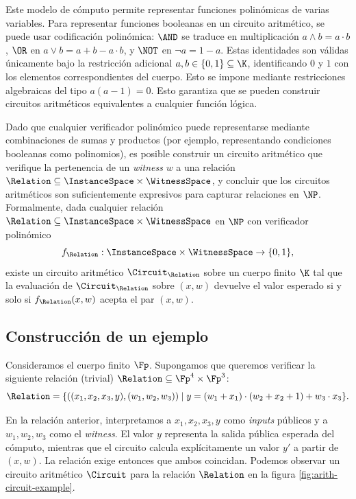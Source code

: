 Este modelo de cómputo permite representar funciones polinómicas de varias variables. Para representar funciones booleanas en un circuito aritmético, se puede usar codificación polinómica: $\AND$ se traduce en multiplicación  $a \wedge b = a \cdot b$, $\OR$ en $a \vee b = a + b - a \cdot b$, y $\NOT$ en $\neg a = 1 - a$. Estas identidades son válidas únicamente bajo la restricción adicional $a, b \in \{0,1\} \subseteq \K$, identificando $0$ y $1$ con los elementos correspondientes del cuerpo. Esto se impone mediante restricciones algebraicas del tipo $a(a - 1) = 0$. Esto garantiza que se pueden construir circuitos aritméticos equivalentes a cualquier función lógica.

Dado que cualquier verificador polinómico puede representarse mediante combinaciones de sumas y productos (por ejemplo, representando condiciones booleanas como polinomios), es posible construir un circuito aritmético que verifique la pertenencia de un \textit{witness} $w$ a una relación $\Relation \subseteq \InstanceSpace \times \WitnessSpace$, y concluir que los circuitos aritméticos son suficientemente expresivos \cite{arora2006computational} para capturar relaciones en $\NP$. Formalmente, dada cualquier relación $\Relation \subseteq \InstanceSpace \times \WitnessSpace$ en $\NP$ con verificador polinómico
$$f_\Relation : \InstanceSpace \times \WitnessSpace \to \{0,1\},$$
existe un circuito aritmético $\Circuit_\Relation$ sobre un cuerpo finito $\K$ tal que la evaluación de $\Circuit_\Relation$ sobre $(x,w)$ devuelve el valor esperado si y solo si $f_\Relation(x,w)$ acepta el par $(x,w)$.

\subsection{Construcción de un ejemplo}

Consideramos el cuerpo finito $\Fp$. Supongamos que queremos verificar la siguiente relación (trivial) $\Relation \subseteq \Fp^4 \times \Fp^3$:
$$\Relation = \{((x_1, x_2, x_3, y), (w_1, w_2, w_3)) \mid y = (w_1 + x_1) \cdot (w_2 + x_2 + 1) + w_3 \cdot x_3\}.$$

En la relación anterior, interpretamos a $x_1, x_2, x_3, y$ como \textit{inputs} públicos y a $w_1, w_2, w_3$ como el \textit{witness}. El valor $y$ representa la salida pública esperada del cómputo, mientras que el circuito calcula explícitamente un valor $y'$ a partir de $(x,w)$. La relación exige entonces que ambos coincidan. Podemos observar un circuito aritmético $\Circuit$ para la relación $\Relation$ en la figura \ref{fig:arith-circuit-example}.

